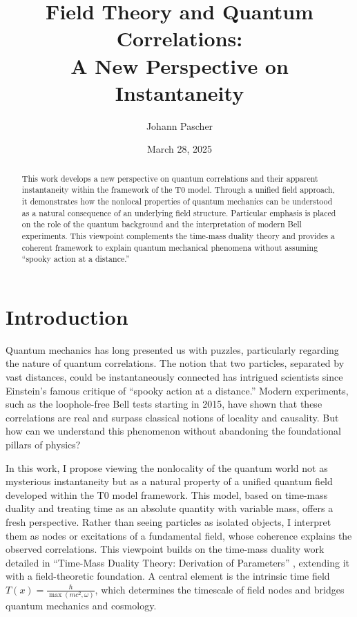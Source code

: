 \documentclass[a4paper,12pt]{article}
\title{Field Theory and Quantum Correlations: \\A New Perspective on Instantaneity}
\author{Johann Pascher}
\date{March 28, 2025}
\newcommand{\Tfield}{T(x)}
\theoremstyle{definition}
\theoremstyle{remark}
\begin{document}
	
	\maketitle
	
	\begin{abstract}
		This work develops a new perspective on quantum correlations and their apparent instantaneity within the framework of the T0 model. Through a unified field approach, it demonstrates how the nonlocal properties of quantum mechanics can be understood as a natural consequence of an underlying field structure. Particular emphasis is placed on the role of the quantum background and the interpretation of modern Bell experiments. This viewpoint complements the time-mass duality theory and provides a coherent framework to explain quantum mechanical phenomena without assuming “spooky action at a distance.”
	\end{abstract}
	
	\tableofcontents
	\newpage
	
	\section{Introduction}
	
	Quantum mechanics has long presented us with puzzles, particularly regarding the nature of quantum correlations. The notion that two particles, separated by vast distances, could be instantaneously connected has intrigued scientists since Einstein’s famous critique of “spooky action at a distance.” Modern experiments, such as the loophole-free Bell tests starting in 2015, have shown that these correlations are real and surpass classical notions of locality and causality. But how can we understand this phenomenon without abandoning the foundational pillars of physics?
	
	In this work, I propose viewing the nonlocality of the quantum world not as mysterious instantaneity but as a natural property of a unified quantum field developed within the T0 model framework. This model, based on time-mass duality and treating time as an absolute quantity with variable mass, offers a fresh perspective. Rather than seeing particles as isolated objects, I interpret them as nodes or excitations of a fundamental field, whose coherence explains the observed correlations. This viewpoint builds on the time-mass duality work detailed in “Time-Mass Duality Theory: Derivation of Parameters” \cite{pascher_params_2025}, extending it with a field-theoretic foundation. A central element is the intrinsic time field \(\Tfield = \frac{\hbar}{\max(m c^2, \omega)}\), which determines the timescale of field nodes and bridges quantum mechanics and cosmology.
	
\end{document}
